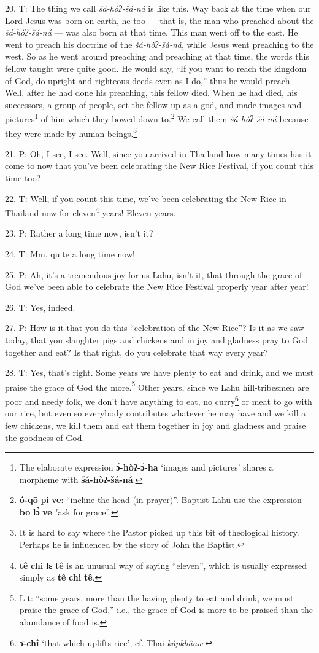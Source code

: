 20. T: The thing we call \textit{šá-hòʔ-šá-ná} is like this. Way back at
the time when our Lord Jesus was born on earth, he too --- that is, the man who
preached about the \textit{šá-hòʔ-šá-ná} --- was also born at that time.
This man went off to the east. He went to preach his doctrine of the \textit{šá-hòʔ-šá-ná},
while Jesus went preaching to the west. So as he went around preaching and preaching
at that time, the words this fellow taught were quite good. He would say, ``If
you want to reach the kingdom of God, do upright and righteous deeds even as I
do,'' thus he would preach. Well, after he had done his preaching, this fellow
died. When he had died, his successors, a group of people, set the fellow up as
a god, and made images and pictures\footnote{The elaborate expression \textbf{ɔ̀-hòʔ-ɔ̀-ha} `images and pictures' shares a morpheme with \textbf{šá-hòʔ-šá-ná}.} of him which they bowed down to.\footnote{\textbf{ó-qō} \textbf{pɨ} \textbf{ve}: ``incline the head (in prayer)''. Baptist Lahu use the expression \textbf{bo} \textbf{lɔ̀} \textbf{ve} "ask for grace''.} We
call them \textit{šá-hòʔ-šá-ná} because they were made by human beings.\footnote{It is hard to say where the Pastor picked up this bit of theological history. Perhaps he is influenced by the story of John the Baptist.}

21. P: Oh, I see, I see. Well, since you arrived in Thailand how many times has
it come to now that you've been celebrating the New Rice Festival, if you count
this time too?

22. T: Well, if you count this time, we've been celebrating the New Rice in Thailand
now for eleven\footnote{\textbf{tê} \textbf{chi} \textbf{lɛ} \textbf{tê} is an unusual way of saying ``eleven'', which is usually expressed simply as \textbf{tê} \textbf{chi} \textbf{tê}.} years! Eleven years.

23. P: Rather a long time now, isn't it?

24. T: Mm, quite a long time now!

25. P: Ah, it's a tremendous joy for us Lahu, isn't it, that through the grace of
God we've been able to celebrate the New Rice Festival properly year after year!

26. T: Yes, indeed.

27. P: How is it that you do this ``celebration of the New Rice''?
Is it as we saw today, that you slaughter pigs and chickens and in joy and gladness
pray to God together and eat? Is that right, do you celebrate that way every year?

28. T: Yes, that's right. Some years we have plenty to eat and drink, and we must
praise the grace of God the more.\footnote{Lit: ``some years, more than the having plenty to eat and drink, we must praise the grace of God,'' i.e., the grace of God is more to be praised than the abundance of food is.} Other years, since we Lahu hill-tribesmen
are poor and needy folk, we don't have anything to eat, no curry\footnote{\textbf{ɔ̄-chî} `that which uplifts rice'; cf. Thai \textit{kàpkhâaw}.} or meat to
go with our rice, but even so everybody contributes whatever he may have and we
kill a few chickens, we kill them and eat them together in joy and gladness and
praise the goodness of God.

